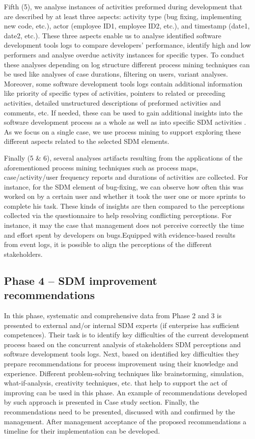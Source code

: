 Fifth (5), we analyse instances of activities preformed during development that are described
by at least three aspects: activity type (bug fixing, implementing new code, etc.), actor (employee
ID1, employee ID2, etc.), and timestamp (date1, date2, etc.). These three aspects enable us to
analyse identified software development tools logs to compare developers’ performance, identify
high and low performers and analyse overdue activity instances for specific types. To conduct these
analyses depending on log structure different process mining techniques can be used like analyses of
case durations, filtering on users, variant analyses. Moreover, some software development tools logs
contain additional information like priority of specific types of activities, pointers to related or
preceding activities, detailed unstructured descriptions of preformed activities and comments, etc. If
needed, these can be used to gain additional insights into the software development process as a
whole as well as into specific SDM activities \citep{Hamdy2020}. As we focus on a single case, we
use process mining to support exploring these different aspects related to the selected SDM
elements.

Finally (5 \& 6), several analyses artifacts resulting from the applications of the
aforementioned process mining techniques such as process maps, case/activity/user frequency
reports and durations of activities are collected. For instance, for the SDM element of bug-fixing, we
can observe how often this was worked on by a certain user and whether it took the user one or
more sprints to complete his task. These kinds of insights are then compared to the perceptions
collected via the questionnaire to help resolving conflicting perceptions. For instance, it may the case
that management does not perceive correctly the time and effort spent by developers on bugs.Equipped with evidence-based results from event logs, it is possible to align the perceptions of the
different stakeholders.


\subsection{Phase 4 – SDM improvement recommendations}
In this phase, systematic and comprehensive data from Phase 2 and 3 is presented to external and/or internal SDM experts (if enterprise has sufficient competences). Their task is to identify key difficulties of the current development process based on the concurrent analysis of stakeholders SDM perceptions and software development tools logs. Next, based on identified key difficulties they prepare recommendations for process improvement using their knowledge and experience. Different problem-solving techniques like brainstorming, simulation, what-if-analysis, creativity techniques, etc. that help to support the act of improving can be used in this phase. An example of recommendations developed by such approach is presented in Case study section. Finally, the recommendations need to be presented, discussed with and confirmed by the management. After management acceptance of the proposed recommendations a timeline for their implementation can be developed. 

